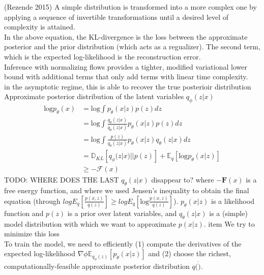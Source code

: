 \documentclass[a4paper,12pt,twoside,openright]{report}
\begin{document}
(Rezende 2015) A simple distribution is transformed into a more complex one by applying a sequence of invertible transformations until a desired level of complexity is attained.\\

In the above equation, the KL-divergence is the loss between the approximate posterior and the prior distribution (which acts as a regualizer). The second term, which is the expected log-likelihood is the reconstruction error.\\

Inference with normalizing flows provides a tighter, modified variational lower bound with additional terms that only add terms with linear time complexity.\\

in the asymptotic regime, this is able to recover the true posterioir distribution \\

Approximate posterior distribution of the latent variables $q_\phi(z|x)$ 
\begin{align}
\text{log} p_{\theta}(x) 
&= \text{log} \int{ p_{\theta}(x|z)p(z) dz } \\
&= \text{log} \int{ \frac{q_{\theta}(z|x)}{q_{\theta}(z|x)}p_{\theta}(x|z) p(z) dz } \\
&= \text{log} \int{ \frac{p(z)}{q_{\theta}(z|x)}p_{\theta}(x|z) q_{\theta}(z|x) dz } \\
&= \mathbb{D}_{KL} \left[ q_{\phi}(z|x) || p(z) \right] + \mathbb{E}_q \left[ \text{log} p_{\theta}(x|z) \right] \\
&\geq -\mathcal{F}(x)
\end{align}
TODO: WHERE DOES THE LAST $q_\theta(z|x)$ disappear to?
where $-\mathbf{F}(x)$ is a free energy function, and where we used Jensen's inequality to obtain the final equation (through $log E_q\left[ \frac{p(x, z)}{q(z)} \right] \geq log E_q\left[ \text{log} \frac{p(x, z)}{q(z)} \right] $).
$p_\theta(x|z)$ is a likelihood function and $p(z)$ is a prior over latent variables, and $q_\theta(z|x)$ is a (simple) model distribution with which we want to approximate $p(x|z)$.
item We try to minimize this loss \\

To train the model, we need to efficiently (1) compute the derivatives of the expected log-likelihood  $ \nabla \phi \mathbb{E}_{q_\phi(z)}\left[ p_\theta(x|z) \right]$ and (2) choose the richest, computationally-feasible approximate posterior distribution $q(\dot)$. \\
\end{document}
